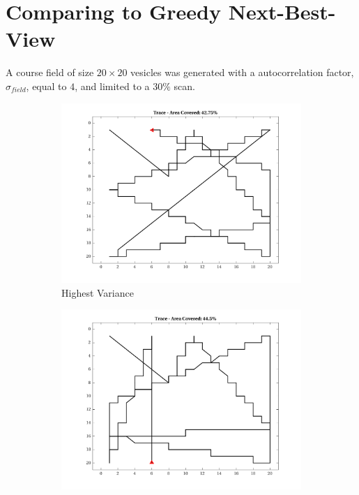 \section{Comparing to Greedy Next-Best-View}
A course field of size $20 \times 20$ vesicles was generated with a autocorrelation factor, $\sigma_{field}$, equal to $4$, and limited to a $30\%$ scan.

\begin{figure}[htb!]
    \centering
    \begin{subfigure}[t]{0.3333\textwidth}
        \centering
        \includegraphics[width=\linewidth]{figures/hbresults/path_nhv_40p_20x20_sf_4_seed_2.png}
        \captionsetup{skip=0.20\baselineskip,size=footnotesize}
        \caption{Highest Variance}
    \end{subfigure}%
    \begin{subfigure}[t]{0.3333\textwidth}
        \centering
        \includegraphics[width=\linewidth]{figures/hbresults/path_nnhv_40p_20x20_sf_4_seed_2.png}

\end{subfigure}
\end{figure}
